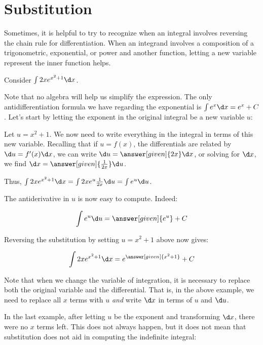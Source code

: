 \documentclass[nooutcomes]{ximera}
\begin{document}
  
\section{Substitution}

Sometimes, it is helpful to try to recognize when an integral involves reversing the chain rule for differentiation. When an integrand involves a composition of a trigonometric, exponential, or power and another function, letting a new variable represent the inner function helps.

\begin{example}
Consider $\int 2x e^{x^2+1} \d x$.  

Note that no algebra will help us simplify the expression.  The only antidifferentiation formula we have regarding the exponential is $\int e^x \d x = e^x +C$.  Let's start by letting the exponent in the original integral be a new variable $u$:

Let $u= x^2+1$.  We now need to write everything in the integral in terms of this new variable.  Recalling that if $u = f(x)$, the differentials are related by $\d u = f'(x) \d x$, we can write $\d u = \answer[given]{2x} \d x$, or solving for $\d x$, we find $\d x = \answer[given]{\frac{1}{2x}} \d u$.

Thus, $\int 2x e^{x^2+1} \d x = \int 2x e^{u} \frac{1}{2x} \d u = \int e^u \d u$.

The antiderivative in $u$ is now easy to compute.  Indeed:

\[ \int e^u \d u = \answer[given]{e^u}+C \]

Reversing the substitution by setting $u=x^2+1$ above  now gives:

\[\int 2xe^{x^2+1} \d x = e^{\answer[given]{x^2+1}}+C \]

\end{example}

\begin{remark}
Note that when we change the variable of integration, it is necessary to replace both the original variable and the differential.  That is, in the above example, we need to replace all $x$ terms with $u$ \emph{and} write $\d x$ in terms of $u$ and $\d u$. 
\end{remark}

In the last example, after letting $u$ be the exponent and transforming $\d x$, there were no $x$ terms left.  This does not always happen, but it does not mean that substitution does not aid in computing the indefinite integral:
\end{document}
